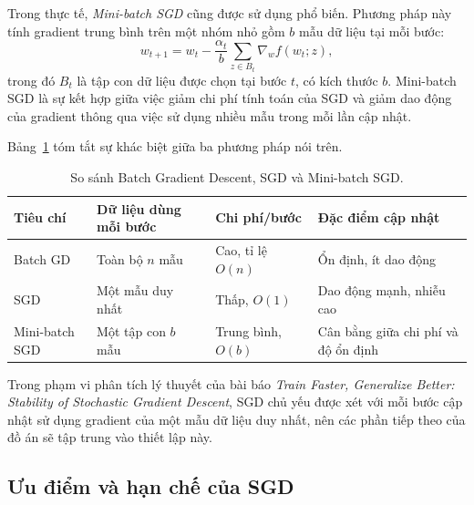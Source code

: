 Trong thực tế, \textit{Mini-batch SGD} cũng được sử dụng phổ biến. Phương pháp này tính gradient trung bình trên một nhóm nhỏ gồm $b$ mẫu dữ liệu tại mỗi bước:
\[
w_{t+1} = w_t - \frac{\alpha_t}{b}\sum_{z \in B_t} \nabla_w f(w_t; z),
\]
trong đó $B_t$ là tập con dữ liệu được chọn tại bước $t$, có kích thước $b$. Mini-batch SGD là sự kết hợp giữa việc giảm chi phí tính toán của SGD và giảm dao động của gradient thông qua việc sử dụng nhiều mẫu trong mỗi lần cập nhật.

Bảng~\ref{tab:gd-sgd-minibatch} tóm tắt sự khác biệt giữa ba phương pháp nói trên.

\begin{table}[H]
\centering
\caption{So sánh Batch Gradient Descent, SGD và Mini-batch SGD.}
\label{tab:gd-sgd-minibatch}
\begin{tabular}{|p{2.6cm}|p{4.2cm}|p{3cm}|p{3.4cm}|}
\hline
\textbf{Tiêu chí} & \textbf{Dữ liệu dùng mỗi bước} & \textbf{Chi phí/bước} & \textbf{Đặc điểm cập nhật} \\ \hline
Batch GD & Toàn bộ $n$ mẫu & Cao, tỉ lệ $O(n)$ & Ổn định, ít dao động \\ \hline
SGD & Một mẫu duy nhất & Thấp, $O(1)$ & Dao động mạnh, nhiễu cao \\ \hline
Mini-batch SGD & Một tập con $b$ mẫu & Trung bình, $O(b)$ & Cân bằng giữa chi phí và độ ổn định \\ \hline
\end{tabular}
\end{table}

Trong phạm vi phân tích lý thuyết của bài báo \textit{Train Faster, Generalize Better: Stability of Stochastic Gradient Descent}, SGD chủ yếu được xét với mỗi bước cập nhật sử dụng gradient của một mẫu dữ liệu duy nhất, nên các phần tiếp theo của đồ án sẽ tập trung vào thiết lập này.

\subsection{Ưu điểm và hạn chế của SGD}

